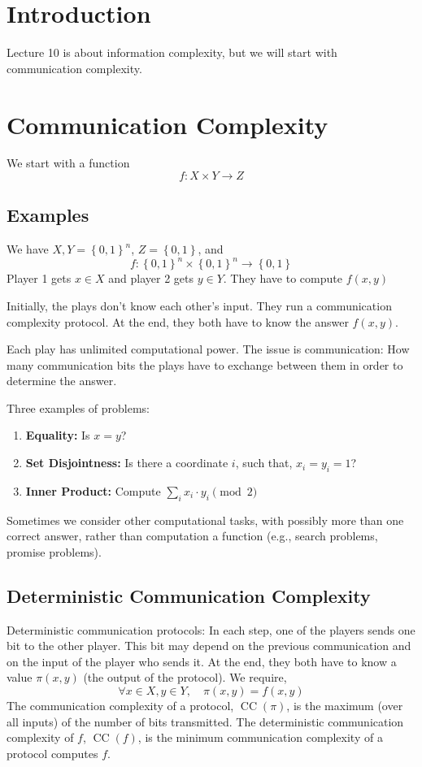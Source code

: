 \documentclass{article}
\begin{document}
\section{Introduction}

Lecture 10 is about information complexity, but we will start with communication complexity.

\section{Communication Complexity}

We start with a function
\[
f: X \times Y \to Z
\]

\subsection{Examples}

We have $X,Y=\left\{0,1\right\}^n$, $Z=\left\{0,1\right\}$, and 
\[
f: \left\{0,1\right\}^n\times \left\{0,1\right\}^n \to \left\{0,1\right\}
\]
Player 1 gets $x\in X$ and player 2 gets $y\in Y$. They have to compute $f(x,y)$

Initially, the plays don't know each other's input. They run a communication complexity protocol. At the end, they both have to know the answer $f(x,y)$.

Each play has unlimited computational power. The issue is communication: How many communication bits the plays have to exchange between them in order to determine the answer.

Three examples of problems:
\begin{enumerate}
    \item \textbf{Equality:} Is $x=y$?
    \item \textbf{Set Disjointness:} Is there a coordinate $i$, such that, $x_i=y_i=1$?
    \item \textbf{Inner Product:} Compute $\sum_i x_i\cdot y_i \pmod 2$
\end{enumerate}
Sometimes we consider other computational tasks, with possibly more than one correct answer, rather than computation a function (e.g., search problems, promise problems).

\subsection{Deterministic Communication Complexity}

Deterministic communication protocols: In each step, one of the players sends one bit to the other player. This bit may depend on the previous communication and on the input of the player who sends it. At the end, they both have to know a value $\pi \left(x,y\right)$ (the output of the protocol). We require,
\[
\forall x\in X, y\in Y,\quad \pi(x,y)=f(x,y)
\]
The communication complexity of a protocol, $\operatorname{CC}(\pi)$, is the maximum (over all inputs) of the number of bits transmitted. The deterministic communication complexity of $f$, $\operatorname{CC}(f)$, is the minimum communication complexity of a protocol computes $f$.
\end{document}
